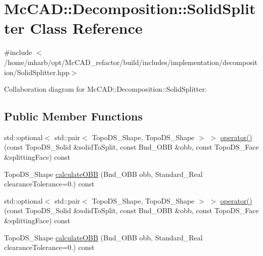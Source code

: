 \hypertarget{classMcCAD_1_1Decomposition_1_1SolidSplitter}{}\section{Mc\+C\+AD\+:\+:Decomposition\+:\+:Solid\+Splitter Class Reference}
\label{classMcCAD_1_1Decomposition_1_1SolidSplitter}


{\ttfamily \#include $<$/home/mharb/opt/\+Mc\+C\+A\+D\+\_\+refactor/build/includes/implementation/decomposition/\+Solid\+Splitter.\+hpp$>$}



Collaboration diagram for Mc\+C\+AD\+:\+:Decomposition\+:\+:Solid\+Splitter\+:
\subsection*{Public Member Functions}
\begin{DoxyCompactItemize}
\item 
std\+::optional$<$ std\+::pair$<$ Topo\+D\+S\+\_\+\+Shape, Topo\+D\+S\+\_\+\+Shape $>$ $>$ \hyperlink{classMcCAD_1_1Decomposition_1_1SolidSplitter_a9c6cda3267256f5bf28ff4a007226499}{operator()} (const Topo\+D\+S\+\_\+\+Solid \&solid\+To\+Split, const Bnd\+\_\+\+O\+BB \&obb, const Topo\+D\+S\+\_\+\+Face \&splitting\+Face) const
\item 
Topo\+D\+S\+\_\+\+Shape \hyperlink{classMcCAD_1_1Decomposition_1_1SolidSplitter_a24c086a0f489167076acfee3bd61d991}{calculate\+O\+BB} (Bnd\+\_\+\+O\+BB obb, Standard\+\_\+\+Real clearance\+Tolerance=0.) const
\item 
std\+::optional$<$ std\+::pair$<$ Topo\+D\+S\+\_\+\+Shape, Topo\+D\+S\+\_\+\+Shape $>$ $>$ \hyperlink{classMcCAD_1_1Decomposition_1_1SolidSplitter_a34b6260bdc707b7cde534dda0572eb69}{operator()} (const Topo\+D\+S\+\_\+\+Solid \&solid\+To\+Split, const Bnd\+\_\+\+O\+BB \&obb, const Topo\+D\+S\+\_\+\+Face \&splitting\+Face) const
\item 
Topo\+D\+S\+\_\+\+Shape \hyperlink{classMcCAD_1_1Decomposition_1_1SolidSplitter_a24c086a0f489167076acfee3bd61d991}{calculate\+O\+BB} (Bnd\+\_\+\+O\+BB obb, Standard\+\_\+\+Real clearance\+Tolerance=0.) const
\end{DoxyCompactItemize}
